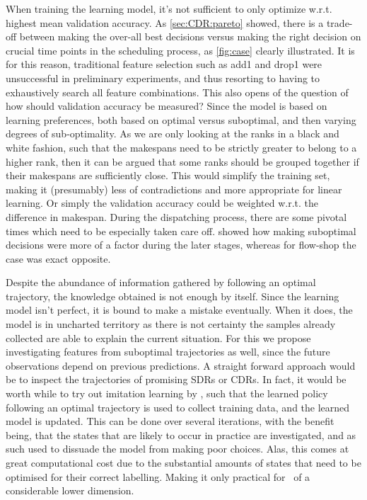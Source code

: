 \documentclass[smallextended]{svjour3}
\begin{document}
When training the learning model, it's not sufficient to only optimize w.r.t. 
highest mean validation accuracy. As \cref{sec:CDR:pareto} showed, there is a 
trade-off between making the over-all best decisions versus making the right 
decision on crucial time points in the scheduling process, as \cref{fig:case} 
clearly illustrated. It is for this reason, traditional feature selection such 
as add1 and drop1 were unsuccessful in preliminary experiments, and thus 
resorting to having to exhaustively search all feature combinations.
This also opens of the question of how should validation accuracy be measured? 
Since the model is based on learning preferences, both based on optimal versus 
suboptimal, and then varying degrees of sub-optimality. As we are only looking 
at the ranks in a black and white fashion, such that the makespans need to be 
strictly greater to belong to a higher rank, then it can be argued that some 
ranks should be grouped together if their makespans are sufficiently close. 
This would simplify the training set, making it (presumably) less of 
contradictions and more appropriate for linear learning. Or simply the 
validation accuracy could be weighted w.r.t. the  difference in 
makespan.
During the dispatching process, there are some pivotal times which need to be 
especially taken care off.  showed how making suboptimal 
decisions were more of a factor during the later stages, whereas for flow-shop 
the case was exact opposite. 

Despite the abundance of information gathered by following an optimal 
trajectory, the knowledge obtained is not enough by itself. Since the learning 
model isn't perfect, it is bound to make a mistake eventually. When it does, 
the model is in uncharted  territory as there is not certainty the samples 
already collected are able to explain the current situation. For this we 
propose investigating features from suboptimal trajectories as well, since the 
future observations depend on previous predictions. 
A straight forward approach would be to inspect 
the trajectories of promising SDRs or CDRs. 
In fact, it would be worth while to try out imitation learning by 
\cite{RossB10,RossGB11}, such that the learned policy following an optimal 
trajectory is used to collect training data, and the learned model is updated. 
This can be done over several iterations, with the benefit being, that the 
states that are likely to occur in practice are investigated, and as such used 
to dissuade the model from making poor choices. Alas, this comes at great 
computational cost due to the substantial amounts of states that need to be 
optimised for their correct labelling. Making it only practical for \jsp\ of 
a considerable lower dimension. 
\end{document}
